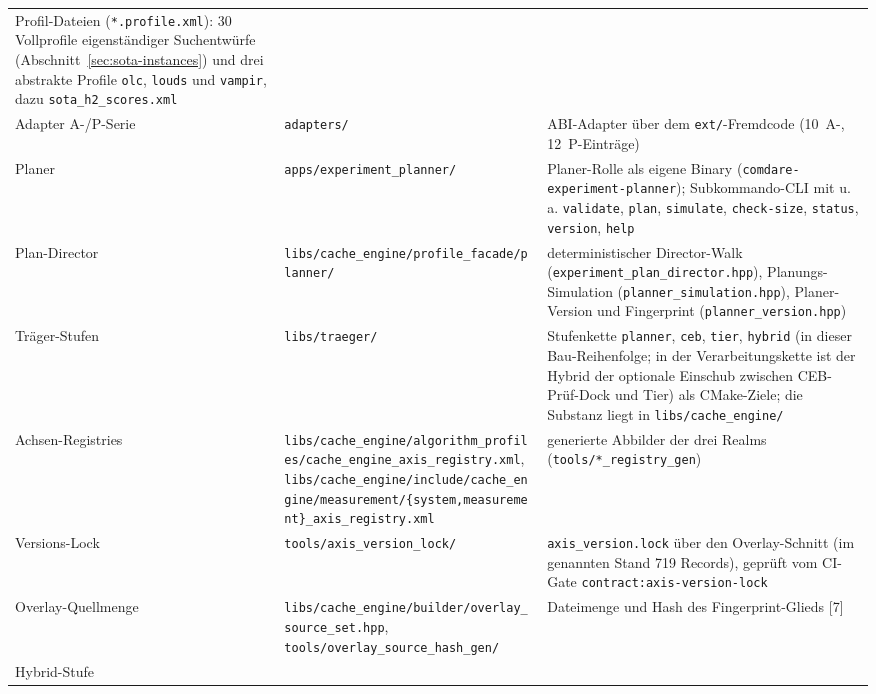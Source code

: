 {\begin{longtable}{@{}>{\raggedright\arraybackslash}p{}>{\raggedright\arraybackslash}p{}>{\raggedright\arraybackslash}p{}@{}}
33 Profil-Dateien (\texttt{*.profile.xml}): 30 Vollprofile eigenständiger Suchentwürfe
(Abschnitt~\ref{sec:sota-instances}) und drei abstrakte Profile \texttt{olc}, \texttt{louds} und
\texttt{vampir}, dazu \texttt{sota\_\allowbreak{}h2\_\allowbreak{}scores.xml} \\
Adapter A-/P-Serie &
\texttt{adapters/} &
ABI-Adapter über dem \texttt{ext/}-Fremdcode (10~A-, 12~P-Einträge) \\
Planer &
\texttt{apps/\allowbreak{}experiment\_planner/} &
Planer-Rolle als eigene Binary (\texttt{comdare-\allowbreak{}experiment-\allowbreak{}planner});
Subkommando-CLI mit u.\,a. \texttt{validate}, \texttt{plan}, \texttt{simulate}, \texttt{check-size},
\texttt{status}, \texttt{version}, \texttt{help} \\
Plan-Director &
\texttt{libs/\allowbreak{}cache\_engine/\allowbreak{}profile\_facade/\allowbreak{}planner/} &
deterministischer Director-Walk (\texttt{experiment\_\allowbreak{}plan\_\allowbreak{}director.hpp}),
Planungs-Simulation (\texttt{planner\_\allowbreak{}simulation.hpp}), Planer-Version und Fingerprint
(\texttt{planner\_\allowbreak{}version.hpp}) \\
Träger-Stufen &
\texttt{libs/\allowbreak{}traeger/} &
Stufenkette \texttt{planner}, \texttt{ceb}, \texttt{tier}, \texttt{hybrid} (in dieser Bau-Reihenfolge; in
der Verarbeitungskette ist der Hybrid der optionale Einschub zwischen CEB-Prüf-Dock und Tier) als
CMake-Ziele; die Substanz liegt in \texttt{libs/\allowbreak{}cache\_engine/} \\
Achsen-Registries &
\texttt{libs/\allowbreak{}cache\_engine/\allowbreak{}algorithm\_profiles/\allowbreak{}cache\_engine\_axis\_registry.xml},
\texttt{libs/\allowbreak{}cache\_engine/\allowbreak{}include/\allowbreak{}cache\_engine/\allowbreak{}measurement/\allowbreak{}\{system,\allowbreak{}measurement\}\_axis\_registry.xml} &
generierte Abbilder der drei Realms (\texttt{tools/\allowbreak{}*\_registry\_gen}) \\
Versions-Lock &
\texttt{tools/\allowbreak{}axis\_version\_lock/} &
\texttt{axis\_\allowbreak{}version.lock} über den Overlay-Schnitt (im genannten Stand 719 Records),
geprüft vom CI-Gate \texttt{contract:\allowbreak{}axis-version-lock} \\
Overlay-Quellmenge &
\texttt{libs/\allowbreak{}cache\_engine/\allowbreak{}builder/\allowbreak{}overlay\_source\_set.hpp},
\texttt{tools/\allowbreak{}overlay\_source\_hash\_gen/} &
Dateimenge und Hash des Fingerprint-Glieds [7] \\
Hybrid-Stufe &

\end{longtable}}

